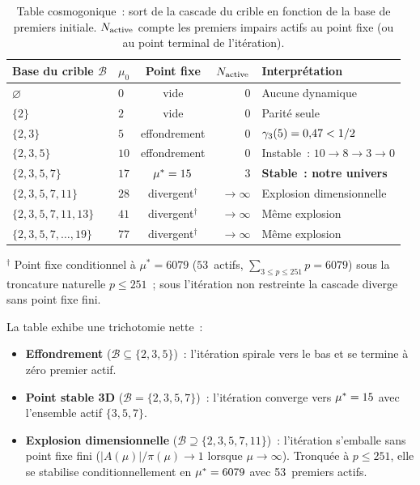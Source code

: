 \documentclass[12pt,a4paper]{article}
\begin{document}
\begin{table}[htbp]
\centering
\caption{Table cosmogonique~: sort de la cascade du crible en
fonction de la base de premiers initiale. $N_{\rm active}$ compte
les premiers impairs actifs au point fixe (ou au point terminal de
l'itération).}
\label{tab:cosmogonic}
\begin{tabular}{llcrl}
\toprule
Base du crible $\mathcal{B}$ & $\mu_0$ & Point fixe & $N_{\rm active}$ & Interprétation \\
\midrule
$\varnothing$           & $0$  & vide        & 0  & Aucune dynamique \\
$\{2\}$                 & $2$  & vide        & 0  & Parité seule \\
$\{2,3\}$               & $5$  & effondrement & 0  & $\gamma_{3}(5) = 0{,}47 < 1/2$ \\
$\{2,3,5\}$             & $10$ & effondrement & 0  & Instable~: $10 \to 8 \to 3 \to 0$ \\
$\{2,3,5,7\}$           & $17$ & ${\mu^{*}} = 15$ & 3  & \textbf{Stable~: notre univers} \\
$\{2,3,5,7,11\}$        & $28$ & divergent$^\dagger$ & $\to\infty$ & Explosion dimensionnelle \\
$\{2,3,5,7,11,13\}$     & $41$ & divergent$^\dagger$ & $\to\infty$ & Même explosion \\
$\{2,3,5,7,\ldots,19\}$ & $77$ & divergent$^\dagger$ & $\to\infty$ & Même explosion \\
\bottomrule
\end{tabular}
\smallskip
\par\noindent\footnotesize
$^\dagger$ Point fixe conditionnel à $\mu^* = 6079$ ($53$~actifs,
$\sum_{3\leq p \leq 251} p = 6079$) sous la troncature naturelle
$p \leq 251$~; sous l'itération non restreinte la cascade diverge
sans point fixe fini.
\end{table}

La table exhibe une trichotomie nette~:
\begin{itemize}[nosep]
\item \textbf{Effondrement} ($\mathcal{B} \subseteq \{2,3,5\}$)~:
  l'itération spirale vers le bas et se termine à zéro premier actif.
\item \textbf{Point stable 3D} ($\mathcal{B} = \{2,3,5,7\}$)~:
  l'itération converge vers ${\mu^{*}} = 15$ avec l'ensemble actif
  $\{3,5,7\}$.
\item \textbf{Explosion dimensionnelle}
  ($\mathcal{B} \supseteq \{2,3,5,7,11\}$)~: l'itération s'emballe
  sans point fixe fini ($|A(\mu)|/\pi(\mu) \to 1$ lorsque
  $\mu \to \infty$). Tronquée à $p \leq 251$, elle se stabilise
  conditionnellement en ${\mu^{*}} = 6079$ avec 53~premiers actifs.
\end{itemize}
\end{document}
